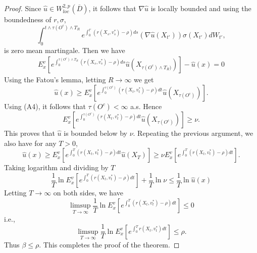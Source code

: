 \documentclass[11pt]{amsart}
\numberwithin{equation}{section}
\begin{document}
\begin{proof}
Since $\hat u \in  W^{2,p}_{loc}(\overline{D})$, %
it follows that $\nabla \hat u$ is locally bounded and using the boundedness of $r,\sigma$,  
$$
\int_{0}^{t \wedge \tau(O^c) \wedge  T_R}  e^{\int_{0}^{t'} (r(X_s,v^*_s)-\rho) ds} (\nabla \hat u(X_{t'}))\sigma(X_{t'}) dW_{t'}, $$ is zero mean martingale.
Then we have
\begin{eqnarray*}
E^v_x\left[ e^{\int_{0}^{\tau(O^c) \wedge T_R } (r(X_s,v^*_s)-\rho) ds} \hat u(X_{\tau(O^c) \wedge T_R) })\right] -\hat u(x) = 0 
\end{eqnarray*}
Using the Fatou's lemma, letting $R\longrightarrow\infty$ we get
$$
\hat u (x)\geq E^v_x \left[ e^{\int_{0}^{\tau(O^c)} (r(X_t, v^*_t) -\rho) dt} \hat u(X_{\tau(O^c)})\right]. %
$$
Using (A4), it follows that $\tau(O^c) < \infty$ a.s. Hence
$$
E^v_x \left[ e^{\int_{0}^{\tau(O^c)} (r(X_t, v^*_t) -\rho) dt} \hat u(X_{\tau(O^c)})\right] \geq \nu.
$$
This proves that $\hat u$ is bounded below by $\nu$. Repeating the previous argument, we also have for 
any $T>0$,
$$
\hat u (x)\geq E^v_x \left[ e^{\int_{0}^T (r(X_t, v^*_t) -\rho) dt} \hat u(X_T)\right] \geq \nu 
E^v_x \left[ e^{\int_{0}^T (r(X_t, v^*_t) -\rho) dt} \right] .
$$
Taking logarithm and dividing by $T$ 
$$
\frac{1}{T} \ln E^v_x \left[ e^{\int_{0}^T (r(X_t, v^*_t) -\rho) dt} \right] + \frac{1}{T} \ln \nu  \leq \frac{1}{T} \ln { \hat u (x) }
$$
Letting $T\longrightarrow\infty$ on both sides, we have 
$$
\limsup_{T \longrightarrow \infty} \frac{1}{T} \ln E^v_x \left[ e^{\int_{0}^T (r(X_t, v^*_t) -\rho) dt} \right]  \leq 0
$$
i.e.,
$$
\limsup_{T \longrightarrow \infty} \frac{1}{T} \ln E^v_x \left[ e^{\int_{0}^T r(X_t, v^*_t)  dt} \right]  \leq \rho.
$$
Thus $\beta \leq \rho$. 
This completes the proof of the theorem. \end{proof}
\end{document}
